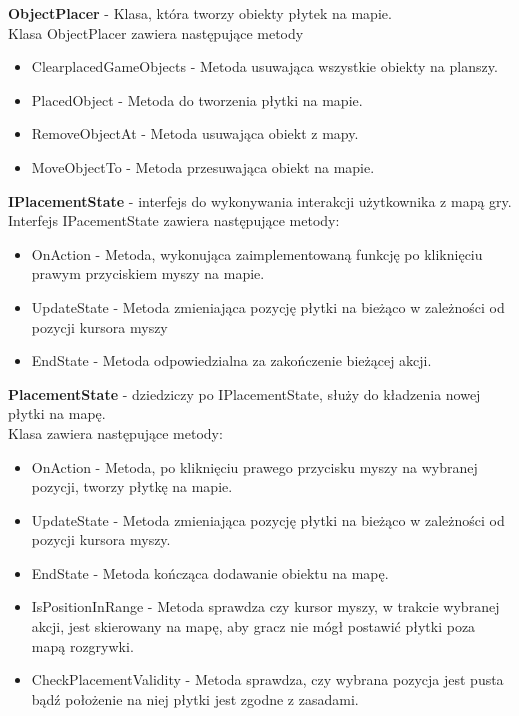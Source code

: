 \documentclass[a4paper,twoside,12pt]{book}
\begin{document}
	
	\textbf{ObjectPlacer} - Klasa, która tworzy obiekty płytek na mapie. \\Klasa ObjectPlacer zawiera następujące metody
		\begin{itemize}
			\item ClearplacedGameObjects - Metoda usuwająca wszystkie obiekty na planszy.
			\item PlacedObject - Metoda do tworzenia płytki na mapie.
			\item RemoveObjectAt - Metoda usuwająca obiekt z mapy.
			\item MoveObjectTo - Metoda przesuwająca obiekt na mapie.
			
		\end{itemize}
	\textbf{IPlacementState} -  interfejs do wykonywania interakcji użytkownika z mapą gry.\\ Interfejs IPacementState zawiera następujące metody:
		\begin{itemize}
			\item OnAction - Metoda, wykonująca zaimplementowaną funkcję po kliknięciu prawym przyciskiem myszy na mapie.  
			\item UpdateState - Metoda zmieniająca pozycję płytki na bieżąco w zależności od pozycji kursora myszy
			\item EndState - Metoda odpowiedzialna za zakończenie bieżącej akcji.
		\end{itemize}
		
		
		\textbf{PlacementState} - dziedziczy po IPlacementState, służy do kładzenia nowej płytki na mapę.\\ Klasa zawiera następujące metody:
		\begin{itemize}
			\item OnAction - Metoda, po kliknięciu prawego przycisku myszy na wybranej pozycji, tworzy płytkę na mapie.
			\item UpdateState - Metoda zmieniająca pozycję płytki na bieżąco w zależności od pozycji kursora myszy.
			\item EndState - Metoda kończąca dodawanie obiektu na mapę.
			\item IsPositionInRange - Metoda sprawdza czy kursor myszy, w trakcie wybranej akcji, jest skierowany na mapę, aby gracz nie mógł postawić płytki poza mapą rozgrywki.
			\item CheckPlacementValidity - Metoda sprawdza, czy wybrana pozycja jest pusta bądź położenie na niej płytki jest zgodne z zasadami.
		\end{itemize}
		
\end{document}
